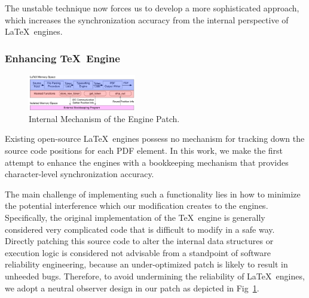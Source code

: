 \documentclass[sigconf]{acmart}
\begin{document}
The unstable technique now forces us to develop a more sophisticated approach, which increases the synchronization accuracy from the internal perspective of \LaTeX\ engines.

\subsubsection{Enhancing \TeX\ Engine}

\begin{figure}[t]
\begin{center}
\includegraphics[width=0.42\textwidth]{figure/patchengine}
\caption{Internal Mechanism of the Engine Patch.}
\label{fig:enginepatch}
\end{center}

\end{figure}

Existing open-source \LaTeX\ engines possess no mechanism for tracking down the source code positions for each PDF element. 
In this work, we make the first attempt to enhance the engines with a bookkeeping mechanism that provides character-level synchronization accuracy.

The main challenge of implementing such a functionality lies in how to minimize the potential interference which our modification creates to the engines. 
Specifically, the original implementation of the \TeX\ engine is generally considered very complicated code that is difficult to modify in a safe way.  
Directly patching this source code  to alter the internal data structures or execution logic is considered not advisable from a standpoint of software reliability engineering, because an under-optimized patch is likely to result in unheeded bugs.
Therefore, to avoid undermining the reliability of \LaTeX\ engines, we adopt a neutral observer design in our patch as depicted in Fig~\ref{fig:enginepatch}.
\end{document}
